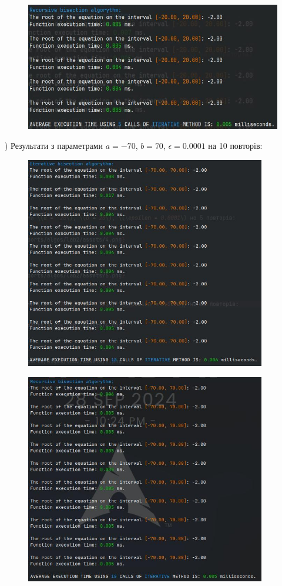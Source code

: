 \begin{figure}[h]
    \centering
    \includegraphics[width=14cm]{reports/algos/lab2/assets/5.png}
\end{figure}

\clearpage
{}) Результати з параметрами \(a = -70\), \(b = 70\), \(\epsilon = 0.0001\) на 10 повторів:
\begin{figure}[h]
    \centering
    \includegraphics[width=10.5cm]{reports/algos/lab2/assets/6.png}
\end{figure}

\begin{figure}[h]
    \centering
    \includegraphics[width=10.5cm]{reports/algos/lab2/assets/7.png}
\end{figure}

